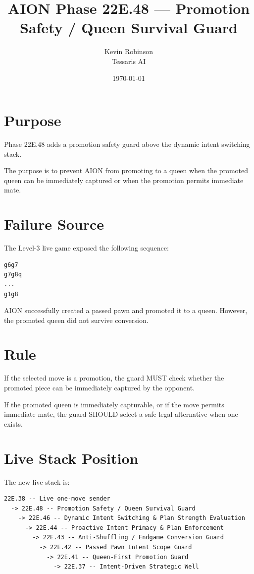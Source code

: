 \documentclass[11pt,a4paper]{article}
\title{\textbf{AION Phase 22E.48 --- Promotion Safety / Queen Survival Guard}}
\author{Kevin Robinson\\Tessaris AI}
\date{\today}
\begin{document}
\maketitle

\section{Purpose}

Phase 22E.48 adds a promotion safety guard above the dynamic intent switching stack.

The purpose is to prevent AION from promoting to a queen when the promoted queen can be immediately captured or when the promotion permits immediate mate.

\section{Failure Source}

The Level-3 live game exposed the following sequence:

\begin{verbatim}
g6g7
g7g8q
...
g1g8
\end{verbatim}

AION successfully created a passed pawn and promoted it to a queen. However, the promoted queen did not survive conversion.

\section{Rule}

If the selected move is a promotion, the guard MUST check whether the promoted piece can be immediately captured by the opponent.

If the promoted queen is immediately capturable, or if the move permits immediate mate, the guard SHOULD select a safe legal alternative when one exists.

\section{Live Stack Position}

The new live stack is:

\begin{verbatim}
22E.38 -- Live one-move sender
  -> 22E.48 -- Promotion Safety / Queen Survival Guard
    -> 22E.46 -- Dynamic Intent Switching & Plan Strength Evaluation
      -> 22E.44 -- Proactive Intent Primacy & Plan Enforcement
        -> 22E.43 -- Anti-Shuffling / Endgame Conversion Guard
          -> 22E.42 -- Passed Pawn Intent Scope Guard
            -> 22E.41 -- Queen-First Promotion Guard
              -> 22E.37 -- Intent-Driven Strategic Well
\end{verbatim}
\end{document}
